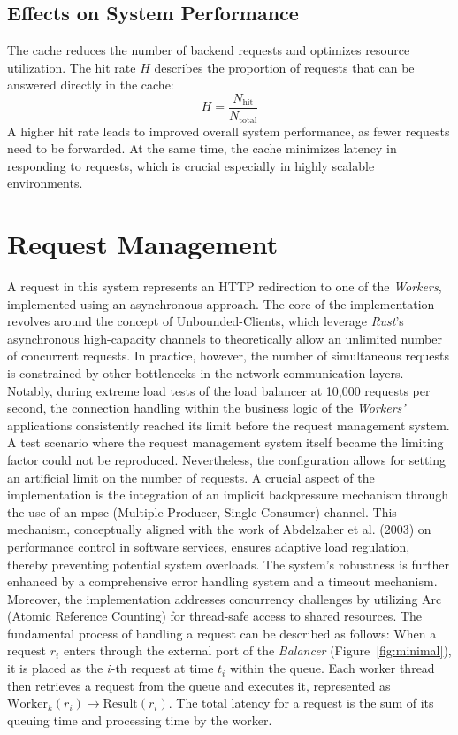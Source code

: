 \documentclass[twocolumn]{webofc}
\begin{document}
    \subsection{Effects on System Performance}
    The cache reduces the number of backend requests and optimizes resource utilization. The hit rate \( H \) describes the proportion of requests that can be answered directly in the cache:
    \[
        H = \frac{N_{\text{hit}}}{N_{\text{total}}}
    \]
    A higher hit rate leads to improved overall system performance, as fewer requests need to be forwarded. At the same time, the cache minimizes latency in responding to requests, which is crucial especially in highly scalable environments\cite{tanenbaum2007distributed}.

    \section{Request Management}
    A request in this system represents an HTTP redirection to one of the \textit{Workers}, implemented using an asynchronous approach. The core of the implementation revolves around the concept of Unbounded-Clients, which leverage \textit{Rust}'s asynchronous high-capacity channels to theoretically allow an unlimited number of concurrent requests. In practice, however, the number of simultaneous requests is constrained by other bottlenecks in the network communication layers. Notably, during extreme load tests of the load balancer at 10,000 requests per second, the connection handling within the business logic of the \textit{Workers'} applications consistently reached its limit before the request management system. A test scenario where the request management system itself became the limiting factor could not be reproduced. Nevertheless, the configuration allows for setting an artificial limit on the number of requests. A crucial aspect of the implementation is the integration of an implicit backpressure mechanism through the use of an mpsc (Multiple Producer, Single Consumer) channel. This mechanism, conceptually aligned with the work of Abdelzaher et al. (2003) on performance control in software services, ensures adaptive load regulation, thereby preventing potential system overloads\cite{backpressure}. The system's robustness is further enhanced by a comprehensive error handling system and a timeout mechanism. Moreover, the implementation addresses concurrency challenges by utilizing Arc (Atomic Reference Counting) for thread-safe access to shared resources. The fundamental process of handling a request can be described as follows: When a request \( r_i \) enters through the external port of the \textit{Balancer} (Figure~\ref{fig:minimal}), it is placed as the \( i \)-th request at time \( t_i \) within the queue. Each worker thread then retrieves a request from the queue and executes it, represented as \( \text{Worker}_k(r_i) \rightarrow \text{Result}(r_i) \). The total latency for a request is the sum of its queuing time and processing time by the worker.
\end{document}

